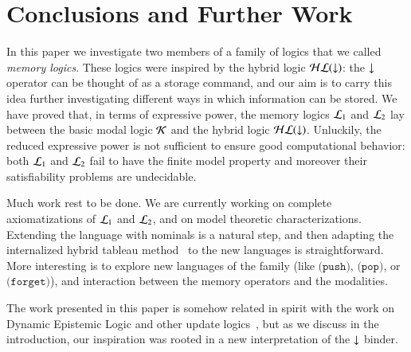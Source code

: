 \section{Conclusions and Further Work}

In this paper we investigate two members of a family of logics that
we called \emph{memory logics}.  These logics were inspired by the
hybrid logic $\mathcal{HL}({\downarrow})$: the ${\downarrow}$ operator can be thought of as a
storage command, and our aim is to carry this idea further
investigating different ways in which information can be stored. We
have proved that, in terms of  expressive power, the memory logics
$\mathcal{L}_1$ and $\mathcal{L}_2$ lay between the basic modal logic $\mathcal{K}$ and the
hybrid logic $\mathcal{HL}({\downarrow})$.  Unluckily, the reduced expressive power is
not sufficient to ensure good computational behavior: both $\mathcal{L}_1$ and
$\mathcal{L}_2$ fail to have the finite model property and moreover their
satisfiability problems are undecidable.

Much work rest to be done. We are currently working on complete
axiomatizations of $\mathcal{L}_1$ and $\mathcal{L}_2$, and on model theoretic
characterizations. Extending the language with nominals is a natural
step, and then adapting the internalized hybrid tableau
method~\cite{backburn00:_inter} to the new languages is
straightforward.  More interesting is to explore new languages of
the family (like $\texttt{(push)}$, $\texttt{(pop)}$, or
$\texttt{(forget)}$), and interaction between the memory operators
and the modalities.


The work presented in this paper is somehow related in spirit with
the work on Dynamic Epistemic Logic and other update
logics~\cite{vanbenthem05,gerbrandy99}, but as we discuss in the
introduction, our inspiration was rooted in a new interpretation of
the ${\downarrow}$ binder.
